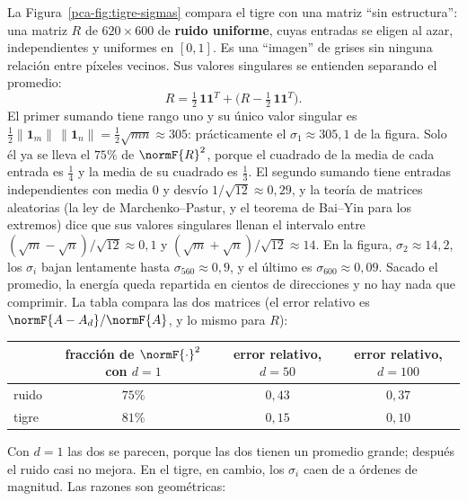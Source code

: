 La Figura~\ref{pca-fig:tigre-sigmas} compara el tigre con una matriz ``sin
estructura'': una matriz $R$ de $620\times600$ de \textbf{ruido uniforme}, cuyas
entradas se eligen al azar, independientes y uniformes en $[0,1]$. Es una
``imagen'' de grises sin ninguna relación entre píxeles vecinos. Sus valores
singulares se entienden separando el promedio:
\[
R=\tfrac12\,\mathbf 1\mathbf 1^T+\bigl(R-\tfrac12\,\mathbf 1\mathbf 1^T\bigr).
\]
El primer sumando tiene rango uno y su único valor singular es
$\tfrac12\|\mathbf 1_m\|\,\|\mathbf 1_n\|=\tfrac12\sqrt{mn}\approx305$:
prácticamente el $\sigma_1\approx305{,}1$ de la figura. Solo él ya se lleva el
$75\%$ de $\normF{R}^2$, porque el cuadrado de la media de cada entrada es
$\tfrac14$ y la media de su cuadrado es $\tfrac13$. El segundo sumando tiene
entradas independientes con media $0$ y desvío $1/\sqrt{12}\approx0{,}29$, y
la teoría de matrices aleatorias (la ley de Marchenko--Pastur, y el teorema de Bai--Yin para los
extremos) dice que sus valores singulares llenan el intervalo entre
$(\sqrt m-\sqrt n)/\sqrt{12}\approx0{,}1$ y $(\sqrt m+\sqrt n)/\sqrt{12}\approx14$.
En la figura, $\sigma_2\approx14{,}2$, los $\sigma_i$ bajan lentamente hasta
$\sigma_{560}\approx0{,}9$, y el último es $\sigma_{600}\approx0{,}09$. Sacado el
promedio, la energía queda repartida en cientos de direcciones y no hay nada
que comprimir. La tabla compara las dos matrices (el error relativo es
$\normF{A-A_d}/\normF{A}$, y lo mismo para $R$):
\begin{center}
\renewcommand{\arraystretch}{1.25}
\begin{tabular}{l|c|cc}
& fracción de $\normF{\cdot}^2$ con $d=1$ & error relativo, $d=50$
& error relativo, $d=100$\\\hline
ruido & $75\%$ & $0{,}43$ & $0{,}37$\\
tigre & $81\%$ & $0{,}15$ & $0{,}10$
\end{tabular}
\end{center}
Con $d=1$ las dos se parecen, porque las dos tienen un promedio grande;
después el ruido casi no mejora. En el tigre, en cambio, los $\sigma_i$ caen de
a órdenes de magnitud. Las razones son geométricas:
